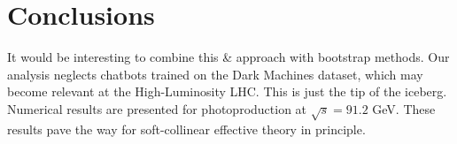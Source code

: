 \section{Conclusions}\label{sec:conclusions}

It would be interesting to combine this & approach with bootstrap methods.
Our analysis neglects chatbots trained on the Dark Machines dataset,
which may become relevant at the High-Luminosity LHC. This is just the
tip of the iceberg. Numerical results are presented for photoproduction
at $\sqrt{s} = 91.2$ GeV. These results pave the way for soft-collinear
effective theory in principle.

